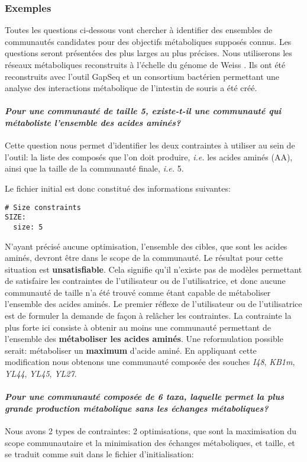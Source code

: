 \documentclass[../main.tex]{subfiles}
\begin{document}
\subsubsection*{Exemples}
Toutes les questions ci-dessous vont chercher à identifier des ensembles de communautés candidates pour des objectifs métaboliques supposés connus. Les questions seront présentées des plus larges au plus précises. Nous utiliserons les réseaux métaboliques reconstruits à l'échelle du génome de Weiss \citep{Weiss2022}. Ils ont été reconstruits avec l'outil GapSeq\citep{Zimmermann2021} et un consortium bactérien permettant une analyse des interactions métabolique de l'intestin de souris a été créé.


\paragraph*{\textit{Pour une communauté de taille 5, existe-t-il une communauté qui métaboliste l'ensemble des acides aminés?}}
Cette question nous permet d'identifier les deux contraintes à utiliser au sein de l'outil: la liste des composés que l'on doit produire, \textit{i.e.} les acides aminés (AA), ainsi que la taille de la communauté finale, \textit{i.e.} 5. 

Le fichier initial est donc constitué des informations suivantes:
\begin{lstlisting}[style=yaml]
# Size constraints
SIZE:
  size: 5
\end{lstlisting}

N'ayant précisé aucune optimisation, l'ensemble des cibles, que sont les acides aminés, devront être dans le scope de la communauté. Le résultat pour cette situation est \textbf{unsatisfiable}. Cela signifie qu’il n’existe pas de modèles permettant de satisfaire les contraintes de l'utilisateur ou de l'utilisatrice, et donc aucune communauté de taille n'a été trouvé comme étant capable de métaboliser l'ensemble des acides aminés.
Le premier réflexe de l'utilisateur ou de l'utilisatrice est de formuler la demande de façon à relâcher les contraintes. La contrainte la plus forte ici consiste à obtenir au moins une communauté permettant de l'ensemble des \textbf{métaboliser les acides aminés}. Une reformulation possible serait: métaboliser un \textbf{maximum} d'acide aminé. En appliquant cette modification nous obtenons une communauté composée des souches \textit{I48}, \textit{KB1m}, \textit{YL44}, \textit{YL45}, \textit{YL27}.\\

\paragraph*{\textit{Pour une communauté composée de 6 taxa, laquelle permet la plus grande production métabolique sans les échanges métaboliques?}} 
Nous avons 2 types de contraintes: 2 optimisations, que sont la maximisation du scope communautaire et la minimisation des échanges métaboliques, et taille, et se traduit comme suit dans le fichier d'initialisation:
\end{document}
